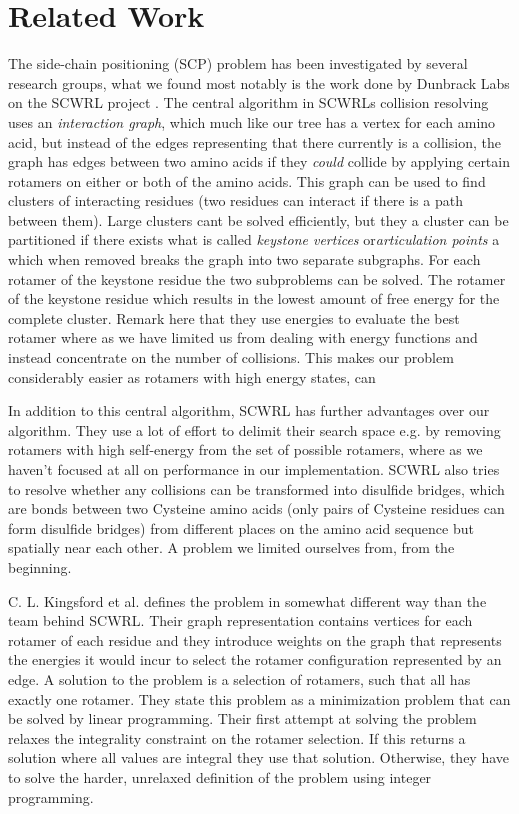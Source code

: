 
\section{Related Work}
The side-chain positioning (SCP) problem has been investigated by
several research groups, what we found most notably is the work done
by Dunbrack Labs on the SCWRL project \cite{canutescu2003graph,
  krivov2009improved}. The central algorithm in SCWRLs collision
resolving uses an \textit{interaction graph}, which much like our tree
has a vertex for each amino acid, but instead of the edges
representing that there currently is a collision, the graph has edges
between two amino acids if they \textit{could} collide by applying
certain rotamers on either or both of the amino acids. This graph can
be used to find clusters of interacting residues (two residues can
interact if there is a path between them). Large clusters cant be
solved efficiently, but they a cluster can be partitioned if there
exists what is called \textit{keystone vertices}
or\textit{articulation points} a which when removed breaks the graph
into two separate subgraphs. For each rotamer of the keystone residue
the two subproblems can be solved. The rotamer of the keystone residue
which results in the lowest amount of free energy for the complete
cluster. Remark here that they use energies to evaluate the best
rotamer where as we have limited us from dealing with energy functions
and instead concentrate on the number of collisions. This makes our
problem considerably easier as rotamers with high energy states, can

In addition to this central algorithm, SCWRL has further advantages
over our algorithm. They use a lot of effort to delimit their search
space e.g. by removing rotamers with high self-energy from the set of
possible rotamers, where as we haven't focused at all on performance
in our implementation. SCWRL also tries to resolve whether any
collisions can be transformed into disulfide bridges, which are bonds
between two Cysteine amino acids (only pairs of Cysteine residues can
form disulfide bridges) from different places on the amino acid
sequence but spatially near each other. A problem we limited ourselves
from, from the beginning. 

C. L. Kingsford et al. \cite{kingsford2005solving} defines the problem
in somewhat different way than the team behind SCWRL. Their graph
representation contains vertices for each rotamer of each residue and
they introduce weights on the graph that represents the energies it
would incur to select the rotamer configuration represented by an
edge. A solution to the problem is a selection of rotamers, such that
all has exactly one rotamer. They state this problem as a minimization
problem that can be solved by linear programming. Their first attempt
at solving the problem relaxes the integrality constraint on the
rotamer selection. If this returns a solution where all values are
integral they use that solution. Otherwise, they have to solve the
harder, unrelaxed definition of the problem using integer programming.

